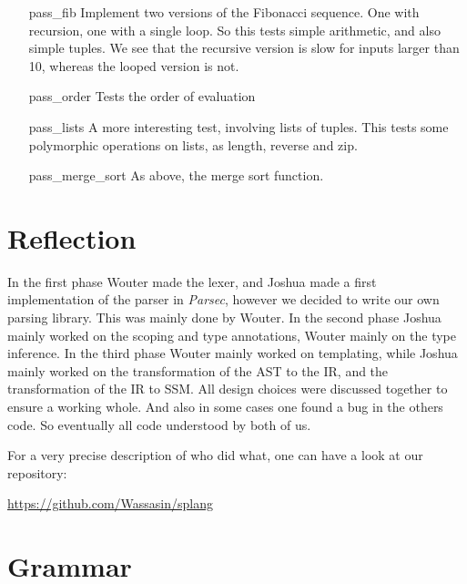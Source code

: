 \documentclass[14pt]{amsart}
\begin{document}
\begin{itemize}
	\item[pass\_fib] Implement two versions of the Fibonacci sequence. One with recursion, one with a single loop. So this tests simple arithmetic, and also simple tuples. We see that the recursive version is slow for inputs larger than 10, whereas the looped version is not.
	\item[pass\_order] Tests the order of evaluation
	\item[pass\_lists] A more interesting test, involving lists of tuples. This tests some polymorphic operations on lists, as length, reverse and zip.
	\item[pass\_merge\_sort] As above, the merge sort function.
\end{itemize}

\section{Reflection}
In the first phase Wouter made the lexer, and Joshua made a first implementation of the parser in \emph{Parsec}, however we decided to write our own parsing library. This was mainly done by Wouter. In the second phase Joshua mainly worked on the scoping and type annotations, Wouter mainly on the type inference. In the third phase Wouter mainly worked on templating, while Joshua mainly worked on the transformation of the AST to the IR, and the transformation of the IR to SSM. All design choices were discussed together to ensure a working whole. And also in some cases one found a bug in the others code. So eventually all code understood by both of us.

For a very precise description of who did what, one can have a look at our repository:

\url{https://github.com/Wassasin/splang}

\newpage
\appendix
\section{Grammar}

\newcommand{\tok}[1]{`\texttt{#1}'}
\newcommand{\I}{\hspace{0.1cm}$\mid$\hspace{0.2cm}}
\end{document}
